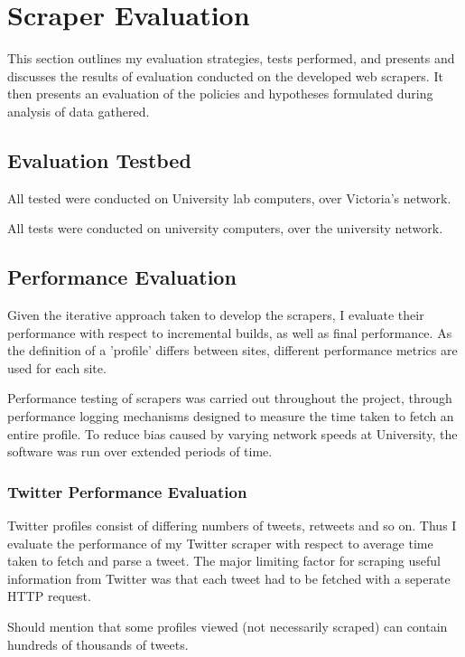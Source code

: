 \chapter{Scraper Evaluation}\label{C:us}

This section outlines my evaluation strategies, tests performed, and presents and discusses the results of evaluation conducted on the developed web scrapers. It then presents an evaluation of the policies and hypotheses formulated during analysis of data gathered. 

\section{Evaluation Testbed}

All tested were conducted on University lab computers, over Victoria's network. 

All tests were conducted on university computers, over the university network. %

\section{Performance Evaluation}

Given the iterative approach taken to develop the scrapers, I evaluate their performance with respect to incremental builds, as well as final performance. As the definition of a 'profile' differs between sites, different performance metrics are used for each site. 

Performance testing of scrapers was carried out throughout the project, through performance logging mechanisms designed to measure the time taken to fetch an entire profile. To reduce bias caused by varying network speeds at University, the software was run over extended periods of time.

\subsection{Twitter Performance Evaluation}

Twitter profiles consist of differing numbers of tweets, retweets and so on. Thus I evaluate the performance of my Twitter scraper with respect to average time taken to fetch and parse a tweet. The major limiting factor for scraping useful information from Twitter was that each tweet had to be fetched with a seperate HTTP request. 

Should mention that some profiles viewed (not necessarily scraped) can contain hundreds of thousands of tweets.

